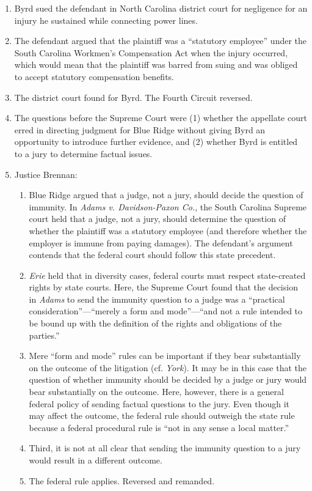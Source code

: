 \begin{enumerate}
    \item Byrd sued the defendant in North Carolina district court for 
    negligence for an injury he sustained while connecting power lines.
    \item The defendant argued that the plaintiff was a ``statutory employee'' 
    under the South Carolina Workmen's Compensation Act when the injury 
    occurred, which would mean that the plaintiff was barred from suing and 
    was obliged to accept statutory compensation benefits.
    \item The district court found for Byrd. The Fourth Circuit reversed.
    \item The questions before the Supreme Court were (1) whether the 
    appellate court erred in directing judgment for Blue Ridge without giving 
    Byrd an opportunity to introduce further evidence, and (2) whether Byrd is 
    entitled to a jury to determine factual issues.
    \item Justice Brennan:
    \begin{enumerate}
        \item Blue Ridge argued that a judge, not a jury, should decide the 
        question of immunity. In \emph{Adams v. Davidson-Paxon Co.}, the South 
        Carolina Supreme court held that a judge, not a jury, should determine 
        the question of whether the plaintiff was a statutory employee (and 
        therefore whether the employer is immune from paying damages). The 
        defendant's argument contends that the federal court should follow 
        this state precedent.
        \item \emph{Erie} held that in diversity cases, federal courts 
        must respect state-created rights by state courts. Here, the Supreme 
        Court found that the decision in \emph{Adams} to send the immunity 
        question to a judge was a ``practical consideration''---``merely a 
        form and mode''---``and not a rule intended to be bound up with the 
        definition of the rights and obligations of the parties.''
        \item Mere ``form and mode'' rules can be important if they 
        bear substantially on the outcome of the litigation (cf. 
        \emph{York}). It may be in this case that the question of whether 
        immunity should be decided by a judge or jury would bear substantially 
        on the outcome. Here, however, there is a general federal policy of 
        sending factual questions to the jury. Even though it may affect the 
        outcome, the federal rule should outweigh the state rule because a 
        federal procedural rule is ``not in any sense a local matter.''
        \item Third, it is not at all clear that sending the immunity question 
        to a jury would result in a different outcome.
        \item The federal rule applies. Reversed and remanded.
    \end{enumerate}
\end{enumerate}

